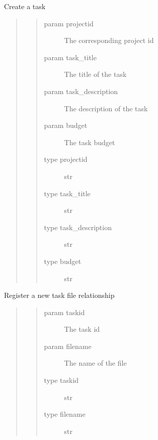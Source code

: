 \documentclass[letterpaper,10pt,english]{sphinxmanual}
\begin{document}
\begin{fulllineitems}
\label{\detokenize{index:models.project.set_task}}
Create a task
\begin{quote}
\begin{quote}\begin{description}
\item[{param projectid}] \leavevmode
The corresponding project id

\item[{param task\_title}] \leavevmode
The title of the task

\item[{param task\_description}] \leavevmode
The description of the task

\item[{param budget}] \leavevmode
The task budget

\item[{type projectid}] \leavevmode
str

\item[{type task\_title}] \leavevmode
str

\item[{type task\_description}] \leavevmode
str

\item[{type budget}] \leavevmode
str

\end{description}\end{quote}
\end{quote}

\end{fulllineitems}


\begin{fulllineitems}
\label{\detokenize{index:models.project.set_task_file}}
Register a new task \sphinxhyphen{} file relationship
\begin{quote}
\begin{quote}\begin{description}
\item[{param taskid}] \leavevmode
The task id

\item[{param filename}] \leavevmode
The name of the file

\item[{type taskid}] \leavevmode
str

\item[{type filename}] \leavevmode
str

\end{description}\end{quote}
\end{quote}

\end{fulllineitems}
\end{document}
